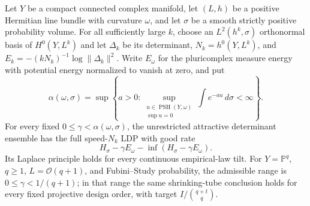 \begin{corollary}
\label{att:polarized-extension}
Let $Y$ be a compact connected complex manifold, let $(L,h)$ be a
positive Hermitian line bundle with curvature $\omega$, and let $\sigma$
be a smooth strictly positive probability volume. For all sufficiently large $k$, choose an $L^2(h^k,\sigma)$
orthonormal basis of $H^0(Y,L^k)$ and let $\Delta_k$ be its determinant,
$N_k=h^0(Y,L^k)$, and $E_k=-(kN_k)^{-1}\log\|\Delta_k\|^2$.
Write $E_\omega$ for the pluricomplex measure energy with potential
energy normalized to vanish at zero, and put
\[
 \alpha(\omega,\sigma)=\sup\left\{a>0:
 \sup_{\substack{u\in\operatorname{PSH}(Y,\omega)\\ \sup u=0}}
             \int e^{-au}\,d\sigma<\infty\right\}.
\]
For every fixed $0\le\gamma<\alpha(\omega,\sigma)$, the unrestricted
attractive determinant ensemble has the full speed-$N_k$ LDP with good
rate
\[
 H_\sigma-\gamma E_\omega-\inf(H_\sigma-\gamma E_\omega).
\]
Its Laplace principle holds for every continuous empirical-law tilt.
For $Y=\mathbb P^q$, $q\ge1$, $L=\mathcal O(q+1)$, and Fubini--Study probability,
the admissible range is $0\le\gamma<1/(q+1)$; in that range the same
shrinking-tube conclusion holds for every fixed projective design order,
with target $I/\binom{q+t}{q}$.
\end{corollary}

